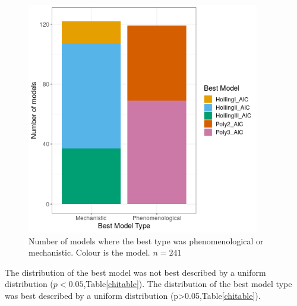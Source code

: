 \documentclass{article}
\begin{document}
\begin{figure}[h!t] 
    \centering
    \includegraphics[width=4in]{../Results/Plots/modelbesttype.png}
    \caption{Number of models where the best type was phenomenological or mechanistic. Colour is the model. $n=241$}
    \label{fig:modelbesttype}
\end{figure}
The distribution of the best model was not best described by a uniform distribution ($p<0.05$,Table\ref{chitable}).  The distribution of the best model type was best described by a uniform distribution (p>0.05,Table\ref{chitable}).

\end{document}
